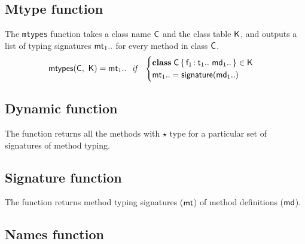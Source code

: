 \documentclass[acmlarge, anonymous, authordraft, review]{acmart} %
\begin{document}
\subsection{Mtype function}

The \texttt{mtypes} function takes a class name $\C$ and the class table
$\K$, and outputs a list of typing signatures $\mt[1]..$ for every method in
class $\C$. \\


\begin{equation*}
\classoff\C\K = \mt[1].. ~~\mathit{if}~~ \begin{cases}

 \Class \C {{\Fdef{\f[1]}{\t[1]}..}}{\md[1]..} \in \K\\
\mt[1].. = \sign{\md[1]..} 

\end{cases}
\end{equation*}


\subsection{Dynamic function}

The  function returns all the methods with $\star$ type for a particular set of 
signatures of method typing.

\begin{mathpar}

\end{mathpar}

\subsection{Signature function}

The  function returns method typing signatures ($\mt$) of method definitions ($\md$).

\begin{mathpar}

\end{mathpar}

\subsection{Names function}
\end{document}
